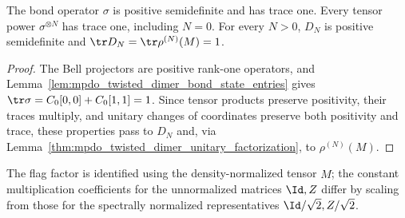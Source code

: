 \begin{lemma}%
    \label{thm:mpdo_twisted_dimer_factor_normalization}
    \leanok
    The bond operator $\sigma$ is positive semidefinite and has trace one.
    Every tensor power $\sigma^{\otimes N}$ has trace one, including
    $N=0$. For every $N>0$, $D_N$ is positive semidefinite and
    $\tr D_N=\tr\rho^{(N)}(M)=1$.
\end{lemma}
\begin{proof}\leanok
    The Bell projectors are positive rank-one operators, and
    Lemma~\ref{lem:mpdo_twisted_dimer_bond_state_entries} gives
    $\tr\sigma=C_0[0,0]+C_0[1,1]=1$.
    Since tensor products preserve positivity, their traces multiply, and
    unitary changes of coordinates preserve both positivity and trace,
    these properties pass to $D_N$ and, via
    Lemma~\ref{thm:mpdo_twisted_dimer_unitary_factorization}, to
    $\rho^{(N)}(M)$.
\end{proof}

The flag factor is identified using the density-normalized tensor
$\widehat M$; the constant multiplication coefficients for the unnormalized
matrices $\Id,Z$ differ by scaling from those for the spectrally normalized
representatives $\Id/\sqrt2,Z/\sqrt2$.

